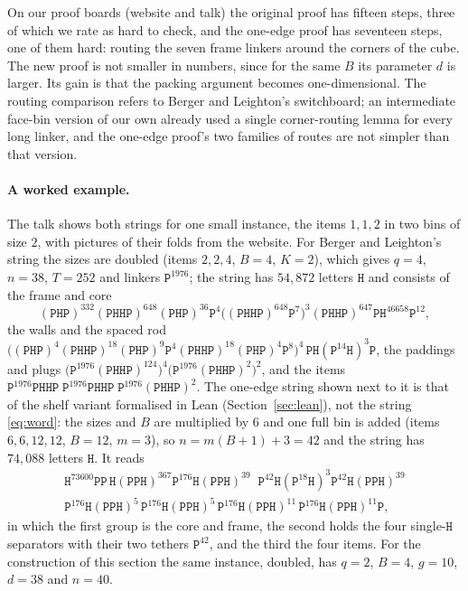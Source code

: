 \documentclass[11pt,letterpaper]{article}
\theoremstyle{definition}
\theoremstyle{remark}
\newcommand{\Hh}{\mathtt{H}}
\newcommand{\Pp}{\mathtt{P}}
\begin{document}
On our proof boards (website and talk) the original proof has fifteen steps, three of which we rate
as hard to check, and the one-edge proof has seventeen steps, one of them hard: routing the seven
frame linkers around the corners of the cube. The new proof is not smaller in numbers, since for the
same $B$ its parameter $d$ is larger. Its gain is that the packing argument becomes one-dimensional.
The routing comparison refers to Berger and Leighton's switchboard; an intermediate face-bin version
of our own already used a single corner-routing lemma for every long linker, and the one-edge proof's
two families of routes are not simpler than that version.

\paragraph{A worked example.}
The talk shows both strings for one small instance, the items $1,1,2$ in two bins of size $2$, with
pictures of their folds from the website. For Berger and Leighton's string the sizes are doubled
(items $2,2,4$, $B=4$, $K=2$), which gives $q=4$, $n=38$, $T=252$ and linkers $\Pp^{1976}$; the
string has $54{,}872$ letters $\Hh$ and consists of the frame and core
\[
(\Pp\Hh\Pp)^{332}(\Pp\Hh\Hh\Pp)^{648}(\Pp\Hh\Pp)^{36}\Pp^{4}\bigl((\Pp\Hh\Hh\Pp)^{648}\Pp^{7}\bigr)^{3}(\Pp\Hh\Hh\Pp)^{647}\Pp\Hh^{46658}\Pp^{12},
\]
the walls and the spaced rod
$\bigl((\Pp\Hh\Pp)^{4}(\Pp\Hh\Hh\Pp)^{18}(\Pp\Hh\Pp)^{9}\Pp^{4}(\Pp\Hh\Hh\Pp)^{18}(\Pp\Hh\Pp)^{4}\Pp^{8}\bigr)^{4}\,\Pp\Hh(\Pp^{14}\Hh)^{3}\Pp$,
the paddings and plugs
$\bigl(\Pp^{1976}(\Pp\Hh\Hh\Pp)^{124}\bigr)^{4}\bigl(\Pp^{1976}(\Pp\Hh\Hh\Pp)^{2}\bigr)^{2}$, and the items
$\Pp^{1976}\Pp\Hh\Hh\Pp\;\Pp^{1976}\Pp\Hh\Hh\Pp\;\Pp^{1976}(\Pp\Hh\Hh\Pp)^{2}$. The one-edge string shown
next to it is that of the shelf variant formalised in Lean (Section~\ref{sec:lean}), not the string
\eqref{eq:word}: the sizes and $B$ are multiplied by $6$ and one full bin is added (items
$6,6,12,12$, $B=12$, $m=3$), so $n=m(B+1)+3=42$ and the string has $74{,}088$ letters $\Hh$. It
reads
\begin{multline*}
\Hh^{73600}\Pp\Pp\,\Hh(\Pp\Pp\Hh)^{367}\Pp^{176}\Hh(\Pp\Pp\Hh)^{39}\;\;
\Pp^{42}\Hh(\Pp^{18}\Hh)^{3}\Pp^{42}\Hh(\Pp\Pp\Hh)^{39}\\
\Pp^{176}\Hh(\Pp\Pp\Hh)^{5}\,\Pp^{176}\Hh(\Pp\Pp\Hh)^{5}\,\Pp^{176}\Hh(\Pp\Pp\Hh)^{11}\,\Pp^{176}\Hh(\Pp\Pp\Hh)^{11}\Pp,
\end{multline*}
in which the first group is the core and frame, the second holds the four single-$\Hh$ separators
with their two tethers $\Pp^{42}$, and the third the four items. For the construction of this
section the same instance, doubled, has $q=2$, $B=4$, $g=10$, $d=38$ and $n=40$.
\end{document}

